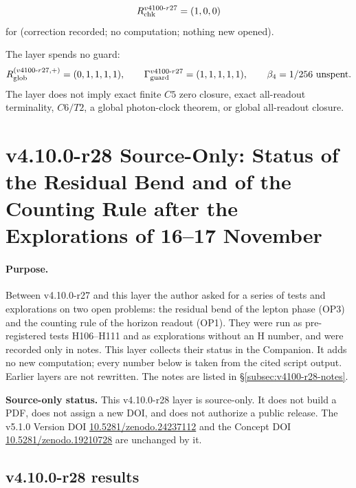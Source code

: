 \[
R_{\rm chk}^{v4100\text{-}r27}=(1,0,0)
\]
for (correction recorded; no computation; nothing new opened).

The layer spends no guard:
\[
R_{\rm glob}^{(v4100\text{-}r27,+)}=(0,1,1,1,1),
\qquad
\Gamma_{\rm guard}^{v4100\text{-}r27}=(1,1,1,1,1),
\qquad
\beta_4=1/256\ \text{unspent}.
\]
The layer does not imply exact finite \(C5\) zero closure, exact all-readout terminality, \(C6/T2\), a global photon-clock theorem,
or global all-readout closure.

\clearpage
\section*{v4.10.0-r28 Source-Only: Status of the Residual Bend and of the Counting Rule after the Explorations of 16--17 November}
\label{sec:v4100-r28-bend-counting-status}

\paragraph{Purpose.}
Between v4.10.0-r27 and this layer the author asked for a series of tests and explorations on two open problems: the residual bend of the
lepton phase (OP3) and the counting rule of the horizon readout (OP1).  They were run as pre-registered tests H106--H111 and as explorations
without an H number, and were recorded only in notes.  This layer collects their status in the Companion.  It adds no new computation; every
number below is taken from the cited script output.  Earlier layers are not rewritten.  The notes are listed in
\S\ref{subsec:v4100-r28-notes}.

\noindent\textbf{Source-only status.}
This v4.10.0-r28 layer is source-only.  It does not build a PDF, does not assign a new DOI,
and does not authorize a public release.  The v5.1.0 Version DOI
\href{https://doi.org/10.5281/zenodo.24237112}{10.5281/zenodo.24237112} and the Concept DOI
\href{https://doi.org/10.5281/zenodo.19210728}{10.5281/zenodo.19210728} are unchanged by it.

\subsection*{v4.10.0-r28 results}
\label{subsec:v4100-r28-results}


